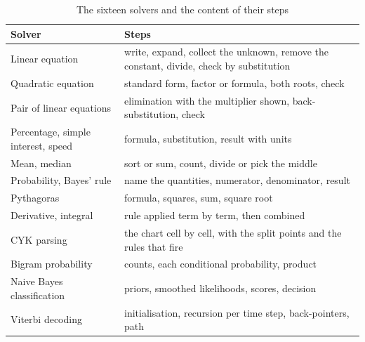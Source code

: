 \documentclass[runningheads]{llncs}
\begin{document}
\begin{table}[H]
\centering
\caption{The sixteen solvers and the content of their steps}
\label{tab:solvers}
\begin{tabular}{p{3.6cm}p{8.0cm}}
\toprule
Solver & Steps \\
\midrule
Linear equation & write, expand, collect the unknown, remove the constant, divide, check by substitution \\
Quadratic equation & standard form, factor or formula, both roots, check \\
Pair of linear equations & elimination with the multiplier shown, back-substitution, check \\
Percentage, simple interest, speed & formula, substitution, result with units \\
Mean, median & sort or sum, count, divide or pick the middle \\
Probability, Bayes' rule & name the quantities, numerator, denominator, result \\
Pythagoras & formula, squares, sum, square root \\
Derivative, integral & rule applied term by term, then combined \\
CYK parsing & the chart cell by cell, with the split points and the rules that fire \\
Bigram probability & counts, each conditional probability, product \\
Naive Bayes classification & priors, smoothed likelihoods, scores, decision \\
Viterbi decoding & initialisation, recursion per time step, back-pointers, path \\
\bottomrule
\end{tabular}
\end{table}
\end{document}
